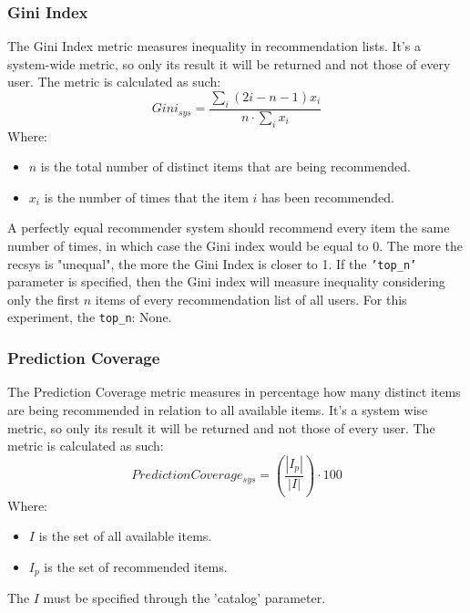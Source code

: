 \documentclass[11pt]{article}
\begin{document}
\subsubsection{Gini Index}\label{subsubsec:gini}
The Gini Index metric measures inequality in recommendation lists.
It's a system-wide metric, so only its result it will be returned and not those of every user.
The metric is calculated as such:
\hfill\break
\hfill\break
    \[
        Gini_{sys} = \frac{\sum_i(2i - n - 1)x_i}{n\cdot\sum_i x_i}
    \]
\hfill\break
\hfill\break
    Where:
\begin{itemize}
    \item $n$ is the total number of distinct items that are being recommended.
    \item $x_i$ is the number of times that the item $i$ has been recommended.
\end{itemize}
\hfill\break
\hfill\break
A perfectly equal recommender system should recommend every item the same number of times, in which case the Gini
index would be equal to 0.
The more the recsys is "unequal", the more the Gini Index is closer to 1.
If the \texttt{'top\_n'} parameter is specified, then the Gini index will measure inequality considering only
the first $n$ items of every recommendation list of all users.
For this experiment, the \texttt{top\_n}:
None.
\hfill\break
\hfill\break

\subsubsection{Prediction Coverage}\label{subsubsec:pred_cov}
The Prediction Coverage metric measures in percentage how many distinct items are being recommended in relation
to all available items.
It's a system wise metric, so only its result it will be returned and not those of every user.
The metric is calculated as such:
\hfill\break
\hfill\break
    \[
         Prediction Coverage_{sys} = (\frac{|I_p|}{|I|})\cdot100
    \]
\hfill\break
\hfill\break
    Where:
\begin{itemize}
    \item $I$ is the set of all available items.
    \item $I_p$ is the set of recommended items.
\end{itemize}
\hfill\break
\hfill\break
The $I$ must be specified through the 'catalog' parameter.
\hfill\break
\hfill\break
\end{document}
